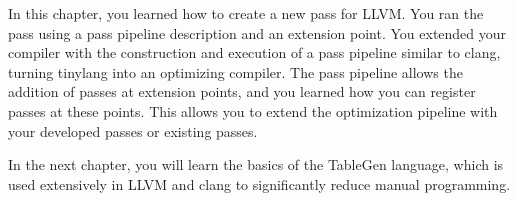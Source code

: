 In this chapter, you learned how to create a new pass for LLVM. You ran the pass using a pass pipeline description and an extension point. You extended your compiler with the construction and execution of a pass pipeline similar to clang, turning tinylang into an optimizing compiler. The pass pipeline allows the addition of passes at extension points, and you learned how you can register passes at these points. This allows you to extend the optimization pipeline with your developed passes or existing passes.

In the next chapter, you will learn the basics of the TableGen language, which is used extensively in LLVM and clang to significantly reduce manual programming.